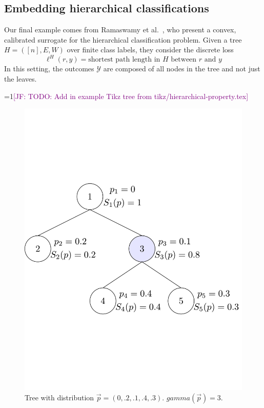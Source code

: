 \documentclass[12pt]{article}
\newcommand{\Comments}{1}
\newcommand{\mynote}[2]{\ifnum\Comments=1\textcolor{#1}{#2}\fi}
\newcommand{\jessie}[1]{\mynote{purple}{[JF: #1]}}
\newcommand{\Y}{\mathcal{Y}}
\begin{document}
\subsection{Embedding hierarchical classifications}
Our final example comes from Ramaswamy et al.~\cite{ramaswamy2015hierarchical}, who present a convex, calibrated surrogate for the hierarchical classification problem.
Given a tree $H = ([n], E,W)$ over finite class labels, they consider the discrete loss 
\begin{equation}\label{eq:tree-loss-discrete}
	\ell^H(r,y) = \text{shortest path length in $H$ between $r$ and $y$}
\end{equation}
In this setting, the outcomes $\Y$ are composed of all nodes in the tree and not just the leaves.

\jessie{TODO: Add in example Tikz tree from tikz/hierarchical-property.tex}
\begin{figure}
	\centering
		\includegraphics[width=0.8\linewidth]{tikz/example-tree-deeper.pdf}
		\caption{Tree with distribution $\vec p = (0, .2, .1, .4, .3)$. $gamma(\vec p) = 3$.}
\end{figure}
\end{document}
